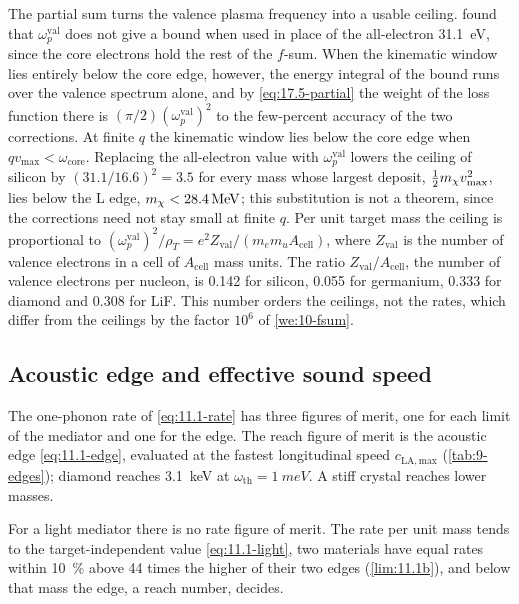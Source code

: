 The partial sum turns the valence plasma frequency into a usable ceiling.  found that $\omega_p^{\mathrm{val}}$ does not give a bound when used in place of the all-electron \SI{31.1}{eV}, since the core electrons hold the rest of the $f$-sum. When the kinematic window lies entirely below the core edge, however, the energy integral of the bound runs over the valence spectrum alone, and by \cref{eq:17.5-partial} the weight of the loss function there is $(\pi/2)(\omega_p^{\mathrm{val}})^2$ to the few-percent accuracy of the two corrections. At finite $q$ the kinematic window lies below the core edge when $qv_{\mathrm{max}} < \omega_{\mathrm{core}}$. Replacing the all-electron value with $\omega_p^{\mathrm{val}}$ lowers the ceiling of silicon by $(31.1/16.6)^2 = 3.5$ for every mass whose largest deposit, $\frac12m_{\chi} v_{\mathrm{max}}^2$, lies below the L edge, $m_{\chi} < \SI{28.4}{MeV}$; this substitution is not a theorem, since the corrections need not stay small at finite $q$. Per unit target mass the ceiling is proportional to $(\omega_p^{\mathrm{val}})^2/\rho_T = e^2Z_{\mathrm{val}}/(m_em_uA_{\mathrm{cell}})$, where $Z_{\mathrm{val}}$ is the number of valence electrons in a cell of $A_{\mathrm{cell}}$ mass units. The ratio $Z_{\mathrm{val}}/A_{\mathrm{cell}}$, the number of valence electrons per nucleon, is 0.142 for silicon, 0.055 for germanium, 0.333 for diamond and 0.308 for LiF. This number orders the ceilings, not the rates, which differ from the ceilings by the factor $10^{6}$ of \cref{we:10-fsum}.

\subsection{Acoustic edge and effective sound speed}\label{sec:17.5-phonon}

The one-phonon rate of \cref{eq:11.1-rate} has three figures of merit, one for each limit of the mediator and one for the edge. The reach figure of merit is the acoustic edge \cref{eq:11.1-edge}, evaluated at the fastest longitudinal speed $c_{\mathrm{LA,max}}$ (\cref{tab:9-edges}); diamond reaches \SI{3.1}{keV} at $\omega_{\mathrm{th}} = \SI{1}{meV}$. A stiff crystal reaches lower masses.

For a light mediator there is no rate figure of merit. The rate per unit mass tends to the target-independent value \cref{eq:11.1-light}, two materials have equal rates within \SI{10}{\percent} above 44 times the higher of their two edges (\cref{lim:11.1b}), and below that mass the edge, a reach number, decides.

